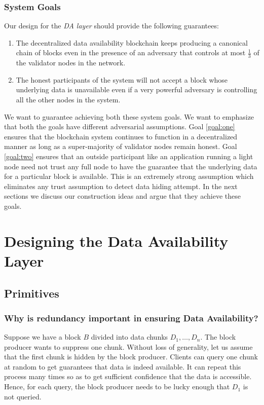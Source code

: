 \documentclass[sigconf, screen=true, nonacm]{acmart}
\newcommand{\DA}{\textit{DA layer}}
\begin{document}
        \subsubsection{System Goals}
            Our design for the \DA{} should provide the following guarantees:
            \begin{enumerate}
                \item \label{goal:one} The decentralized data availability blockchain keeps producing a canonical chain of blocks even in the presence of an adversary that controls at most $\frac{1}{3}$ of the validator nodes in the network. 
                \item \label{goal:two} The honest participants of the system will not accept a block whose underlying data is unavailable even if a very powerful adversary is controlling all the other nodes in the system.
            \end{enumerate}
            We want to guarantee achieving both these system goals. We want to emphasize that both the goals have different adversarial assumptions. Goal \ref{goal:one} ensures that the blockchain system continues to function in a decentralized manner as long as a super-majority of validator nodes remain honest. Goal \ref{goal:two} ensures that an outside participant like an application running a light node need not trust any full node to have the guarantee that the underlying data for a particular block is available. This is an extremely strong assumption which eliminates any trust assumption to detect data hiding attempt. In the next sections we discuss our construction ideas and argue that they achieve these goals. 

\section{Designing the Data Availability Layer}
    \subsection{Primitives}
        \subsubsection{Why is redundancy important in ensuring Data Availability?}
            Suppose we have a block $B$ divided into data chunks $D_1, \dots, D_n$. The block producer wants to suppress one chunk. Without loss of generality, let us assume that the first chunk is hidden by the block producer. Clients can query one chunk at random to get guarantees that data is indeed available. It can repeat this process many times so as to get sufficient confidence that the data is accessible. Hence, for each query, the block producer needs to be lucky enough that $D_1$ is not queried.
\end{document}
